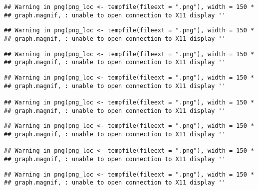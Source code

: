 \documentclass[]{article}
\begin{document}
\begin{verbatim}
## Warning in png(png_loc <- tempfile(fileext = ".png"), width = 150 *
## graph.magnif, : unable to open connection to X11 display ''
\end{verbatim}

\begin{verbatim}
## Warning in png(png_loc <- tempfile(fileext = ".png"), width = 150 *
## graph.magnif, : unable to open connection to X11 display ''
\end{verbatim}

\begin{verbatim}
## Warning in png(png_loc <- tempfile(fileext = ".png"), width = 150 *
## graph.magnif, : unable to open connection to X11 display ''
\end{verbatim}

\begin{verbatim}
## Warning in png(png_loc <- tempfile(fileext = ".png"), width = 150 *
## graph.magnif, : unable to open connection to X11 display ''

## Warning in png(png_loc <- tempfile(fileext = ".png"), width = 150 *
## graph.magnif, : unable to open connection to X11 display ''
\end{verbatim}

\begin{verbatim}
## Warning in png(png_loc <- tempfile(fileext = ".png"), width = 150 *
## graph.magnif, : unable to open connection to X11 display ''

## Warning in png(png_loc <- tempfile(fileext = ".png"), width = 150 *
## graph.magnif, : unable to open connection to X11 display ''
\end{verbatim}

\begin{verbatim}
## Warning in png(png_loc <- tempfile(fileext = ".png"), width = 150 *
## graph.magnif, : unable to open connection to X11 display ''
\end{verbatim}
\end{document}

